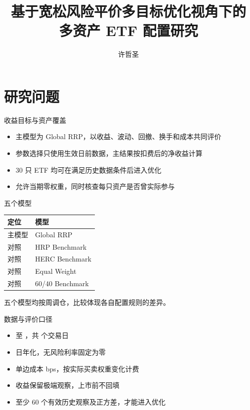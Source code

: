 \documentclass[aspectratio=169,11pt]{beamer}
\title{基于宽松风险平价多目标优化视角下的\\多资产 ETF 配置研究}
\author{许哲圣}
\date{}
\begin{document}
\begin{frame}[plain]\titlepage\end{frame}
\section{研究问题}
\begin{frame}{收益目标与资产覆盖}
\begin{itemize}
\item 主模型为 Global RRP，以收益、波动、回撤、换手和成本共同评价
\item 参数选择只使用生效日前数据，主结果按扣费后的净收益计算
\item 30 只 ETF 均可在满足历史数据条件后进入优化
\item 允许当期零权重，同时核查每只资产是否曾实际参与
\end{itemize}
\end{frame}
\begin{frame}{五个模型}
\begin{tabular}{ll}\toprule
定位 & 模型\\\midrule
主模型 & Global RRP\\
对照 & HRP Benchmark\\
对照 & HERC Benchmark\\
对照 & Equal Weight\\
对照 & 60/40 Benchmark\\\bottomrule
\end{tabular}
\par\medskip
五个模型均按周调仓，比较体现各自配置规则的差异。
\end{frame}
\begin{frame}{数据与评价口径}
\begin{itemize}
\item \evalStartDate{} 至 \evalEndDate{}，共 \primaryObservations{} 个交易日
\item \annualizationDays{} 日年化，无风险利率固定为零
\item 单边成本 \txCostBps{} bps，按实际买卖权重变化计费
\item 收益保留极端观察，上市前不回填
\item 至少 60 个有效历史观察及正方差，才能进入优化
\end{itemize}
\end{frame}
\end{document}

